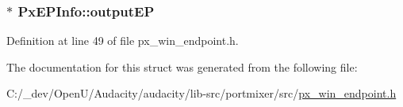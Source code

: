 \subsubsection[{\texorpdfstring{output\+EP}{outputEP}}]{$\ast$ Px\+E\+P\+Info\+::output\+EP}\hypertarget{struct_px_e_p_info_ae184a60f3cd2bb5bb2c83f91bb8a95a4}{}\label{struct_px_e_p_info_ae184a60f3cd2bb5bb2c83f91bb8a95a4}


Definition at line 49 of file px\+\_\+win\+\_\+endpoint.\+h.



The documentation for this struct was generated from the following file\+:\begin{DoxyCompactItemize}
\item 
C\+:/\+\_\+dev/\+Open\+U/\+Audacity/audacity/lib-\/src/portmixer/src/\hyperlink{px__win__endpoint_8h}{px\+\_\+win\+\_\+endpoint.\+h}\end{DoxyCompactItemize}

